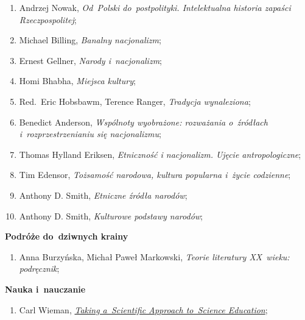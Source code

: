 \documentclass[a4paper,11pt]{article}
\newcommand{\spaceOne}{1.5em}
\newcommand{\tb}{\textbf}
\newcommand{\Center}[1]{\begin{center} #1 \end{center}}
\newcommand{\CenterTB}[1]{\Center{\tb{#1}}}
\newcommand{\Field}[1]{ \begin{center} {\Large \tb{#1} } \end{center} }
\begin{document}
\begin{enumerate}
\item Andrzej Nowak, \emph{Od~Polski do~post\dywiz polityki.
    Intelektualna historia zapaści Rzeczpospolitej};
\item Michael Billing, \emph{Banalny nacjonalizm};
\item Ernest Gellner, \emph{Narody i~nacjonalizm};
\item Homi Bhabha, \emph{Miejsca kultury};
\item Red.~Eric Hobsbawm, Terence Ranger, \emph{Tradycja wynaleziona};
\item Benedict Anderson, \emph{Wspólnoty wyobrażone: rozważania
    o~źródłach i~rozprzestrzenianiu się nacjonalizmu};
\item Thomas Hylland Eriksen, \emph{Etniczność i nacjonalizm. Ujęcie
    antropologiczne};
\item Tim Edensor, \emph{Tożsamość narodowa, kultura popularna i~życie
    codzienne};
\item Anthony D. Smith, \emph{Etniczne źródła narodów};
\item Anthony D. Smith, \emph{Kulturowe podstawy narodów};
\end{enumerate}



\Field{Podróże do~dziwnych krainy}



\begin{enumerate}
\item Anna Burzyńska, Michał Paweł Markowski, \emph{Teorie literatury
    XX~wieku: podręcznik};
\end{enumerate}

\vspace{\spaceOne}



\CenterTB{Nauka i~nauczanie}



\begin{enumerate}
\item Carl Wieman,
  \href{https://www.youtube.com/watch?v=aBEPXfY7Elw}{\emph{Taking
      a~Scientific Approach to~Science Education}};
\end{enumerate}
\end{document}
